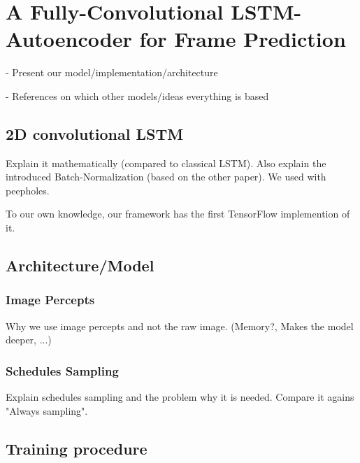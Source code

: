
\chapter{A Fully-Convolutional LSTM-Autoencoder for Frame Prediction} \label{chapter:implementation}

- Present our model/implementation/architecture

- References on which other models/ideas everything is based

\section{2D convolutional LSTM} \label{sec:conv_lstm}

Explain it mathematically (compared to classical LSTM).
Also explain the introduced Batch-Normalization (based on the other paper).
We used with peepholes.

To our own knowledge, our framework has the first TensorFlow implemention of it.


\section{Architecture/Model}



\subsection{Image Percepts}

Why we use image percepts and not the raw image.
(Memory?, Makes the model deeper, ...)

\subsection{Schedules Sampling}

Explain schedules sampling and the problem why it is needed. Compare it agains "Always sampling".


\section{Training procedure}

